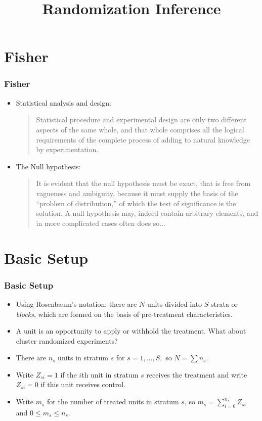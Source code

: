 \documentclass{beamer}
\title{Randomization Inference}
\begin{document}

\frame{\titlepage}
\section{Fisher} %
\label{sec:fisher}

\begin{frame}[t]\frametitle{Fisher}
	\begin{itemize}
		\item<+-> Statistical analysis and design:
		\begin{quote}
			Statistical procedure and experimental design are only two different aspects of the same whole, and that whole comprises all the logical requirements of the complete process of adding to natural knowledge by experimentation.
		\end{quote}
		\item<+-> The Null hypothesis:
		\begin{quote}
			It is evident that the null hypothesis must be exact, that is free from vagueness and ambiguity, because it must supply the basis of the ``problem of distribution,'' of which the test of significance is the solution. A null hypothesis may, indeed contain arbitrary elements, and in more complicated cases often does so...
		\end{quote}
	\end{itemize} 
	
\end{frame}
\section{Basic Setup} %
\label{sec:basic_setup}

\begin{frame}[t]\frametitle{Basic Setup}
	\begin{itemize}
		\item<+-> Using Rosenbaum's notation: there are $N$ units divided into $S$ strata or \textit{blocks}, which
		are formed on the basis of pre-treatment characteristics.
		\item<+-> A unit is an opportunity to apply or withhold the treatment. What about cluster randomized experiments? 
		\item<+-> There are $n_s$ units in stratum $s$ for $s=1,...,S,$ so $N=\sum n_s$.
		\item<+-> Write $Z_{si}=1$ if the $i$th unit in stratum $s$ receives the
		treatment and write $Z_{si}=0$ if this unit receives control.
		\item<+->  Write $m_s$ for the number of treated units in stratum $s$, so
		$m_s=\sum_{i=0}^{n_s}Z_{si}$ and $0\leq m_s \leq n_s$.
	\end{itemize}	
\end{frame}
\end{document}
